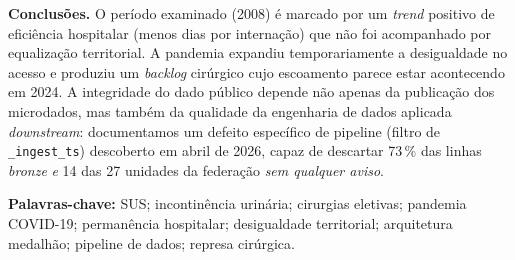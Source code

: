 \documentclass[12pt,a4paper,oneside]{article}
\begin{document}
\begin{singlespace}
\textbf{Conclusões.} O período examinado (2008) é
marcado por um \textit{trend} positivo de eficiência hospitalar
(menos dias por internação) que não foi acompanhado por equalização
territorial. A pandemia
expandiu temporariamente a desigualdade no acesso e produziu um
\textit{backlog} cirúrgico cujo escoamento parece estar acontecendo
em 2024. A integridade do dado público depende não
apenas da publicação dos microdados, mas também da qualidade da
engenharia de dados aplicada \textit{downstream}: documentamos um
defeito específico de pipeline (filtro de \texttt{\_ingest\_ts})
descoberto em abril de 2026, capaz de descartar 73\,\% das linhas
\textit{bronze} \textit{e} 14 das 27 unidades da federação \textit{sem
qualquer aviso}.

\vspace{4pt}
\textbf{Palavras-chave:} SUS; incontinência urinária; cirurgias
eletivas; pandemia COVID-19; permanência hospitalar; desigualdade
territorial; arquitetura medalhão; pipeline de dados; represa
cirúrgica.
\end{singlespace}

\end{document}
